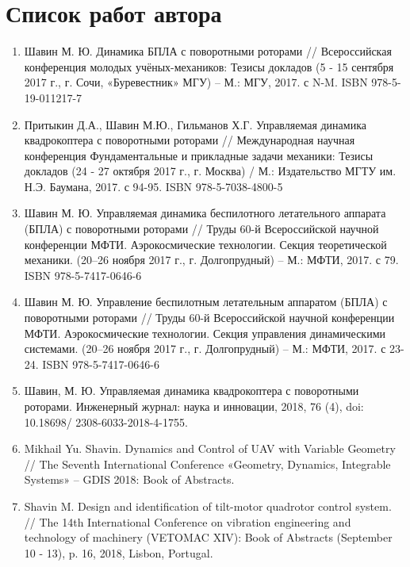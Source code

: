 \chapter{Список работ автора}
\label{list_chapter}
\begin{enumerate}
	\item Шавин М. Ю. Динамика БПЛА с поворотными роторами // Всероссийская конференция молодых учёных-механиков: Тезисы докладов (5 - 15 сентября 2017 г., г. Сочи, «Буревестник» МГУ)  – М.: МГУ, 2017. с N-M. ISBN 978-5-19-011217-7
	
	\item Притыкин Д.А., Шавин М.Ю., Гильманов Х.Г. Управляемая динамика квадрокоптера с поворотными роторами // Международная научная конференция Фундаментальные и прикладные задачи механики: Тезисы докладов (24 - 27 октября 2017 г., г. Москва) / М.: Издательство МГТУ им. Н.Э. Баумана, 2017. с 94-95.
	ISBN 978-5-7038-4800-5
	
	\item Шавин М. Ю. Управляемая динамика беспилотного летательного аппарата (БПЛА) с поворотными роторами // Труды 60-й Всероссийской научной конференции МФТИ. Аэрокосмические технологии. Секция теоретической механики. (20–26 ноября 2017 г., г. Долгопрудный) -- М.: МФТИ, 2017. с 79. ISBN 978-5-7417-0646-6
	
	\item Шавин М. Ю. Управление беспилотным летательным аппаратом (БПЛА) с поворотными роторами // Труды 60-й Всероссийской научной конференции МФТИ. Аэрокосмические технологии. Секция управления динамическими системами. (20–26 ноября 2017 г., г. Долгопрудный) -- М.: МФТИ, 2017. с 23-24. ISBN 978-5-7417-0646-6
	
	\item Шавин, М. Ю. Управляемая динамика квадрокоптера с поворотными роторами. Инженерный журнал: наука и инновации, 2018, 76 (4), doi: 10.18698/ 2308-6033-2018-4-1755.
	
	\item Mikhail Yu. Shavin. Dynamics and Control of UAV with Variable Geometry // The Seventh International Conference «Geometry, Dynamics, Integrable Systems» – GDIS 2018: Book of Abstracts.
	
	\item Shavin M. Design and identification of tilt-motor quadrotor control system. // The 14th International Conference on vibration engineering and technology of machinery (VETOMAC XIV): Book of Abstracts (September 10 - 13), p. 16, 2018, Lisbon, Portugal.
	

\end{enumerate}

